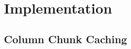 \section{Implementation}
\label{sec:impl}

\subsection{Column Chunk Caching}
\label{subsec:chunk-caching}
